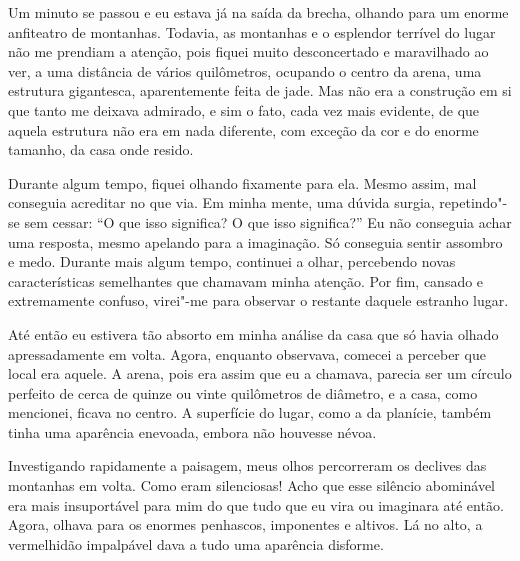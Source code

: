Um minuto se passou e eu estava já na saída da brecha, olhando para um enorme anfiteatro de montanhas. Todavia, as
montanhas e o esplendor terrível do lugar não me prendiam a atenção, pois fiquei muito desconcertado e maravilhado ao
ver, a uma distância de vários quilômetros, ocupando o centro da arena, uma estrutura gigantesca, aparentemente feita
de jade. Mas não era a construção em si que tanto me deixava admirado, e sim o fato, cada vez mais evidente, de que
aquela estrutura não era em nada diferente, com exceção da cor e do enorme tamanho, da casa onde resido.

Durante algum tempo, fiquei olhando fixamente para ela. Mesmo assim, mal conseguia acreditar no que via. Em minha
mente, uma dúvida surgia, repetindo"-se sem cessar: ``O que isso significa? O que isso significa?'' Eu não conseguia achar
uma resposta, mesmo apelando para a imaginação. Só conseguia sentir assombro e medo. Durante mais algum tempo,
continuei a olhar, percebendo novas características semelhantes que chamavam minha atenção. Por fim, cansado e
extremamente confuso, virei"-me para observar o restante daquele estranho lugar.

Até então eu estivera tão absorto em minha análise da casa que só havia olhado apressadamente em volta. Agora,
enquanto observava, comecei a perceber que local era aquele. A arena, pois era assim que eu a chamava, parecia ser um
círculo perfeito de cerca de quinze ou vinte quilômetros de diâmetro, e a casa, como mencionei, ficava no centro.
A superfície do lugar, como a da planície, também tinha uma aparência enevoada, embora não houvesse névoa.

Investigando rapidamente a paisagem, meus olhos percorreram os declives das montanhas em volta. Como eram silenciosas!
Acho que esse silêncio abominável era mais insuportável para mim do que tudo que eu vira ou imaginara até então. Agora,
olhava para os enormes penhascos, imponentes e altivos. Lá no alto, a vermelhidão impalpável dava a tudo uma aparência
disforme.

